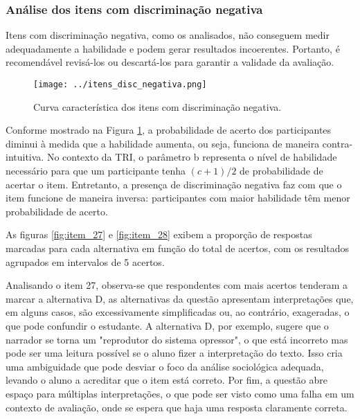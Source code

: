 \subsubsection{Análise dos itens com discriminação negativa}

Itens com discriminação negativa, como os analisados, não conseguem medir adequadamente a habilidade e podem gerar resultados incoerentes. Portanto, é recomendável revisá-los ou descartá-los para garantir a validade da avaliação.


\begin{figure}[!htb]
	\centering
	\caption{Curva característica dos itens com discriminação negativa.}
	\texttt{[image: ../itens\_disc\_negativa.png]}
	\parbox{\textwidth}{
		\centering %
	}
	\label{fig:itens_disc_negativa}
\end{figure}


Conforme mostrado na Figura \ref{fig:itens_disc_negativa}, a probabilidade de acerto dos participantes diminui à medida que a habilidade aumenta, ou seja, funciona de maneira contra-intuitiva. No contexto da TRI, o parâmetro b representa o nível de habilidade necessário para que um participante tenha $(c+1)/2$ de probabilidade de acertar o item. Entretanto, a presença de discriminação negativa faz com que o item funcione de maneira inversa: participantes com maior habilidade têm menor probabilidade de acerto.

As figuras \ref{fig:item_27} e \ref{fig:item_28} exibem a proporção de respostas marcadas para cada alternativa em função do total de acertos, com os resultados agrupados em intervalos de 5 acertos.

Analisando o item 27, observa-se que respondentes com mais acertos tenderam a marcar a alternativa D, as alternativas da questão apresentam interpretações que, em alguns casos, são excessivamente simplificadas ou, ao contrário, exageradas, o que pode confundir o estudante. A alternativa D, por exemplo, sugere que o narrador se torna um "reprodutor do sistema opressor", o que está incorreto mas pode ser uma leitura possível se o aluno fizer a interpretação do texto. Isso cria uma ambiguidade que pode desviar o foco da análise sociológica adequada, levando o aluno a acreditar que o item está correto. Por fim, a questão abre espaço para múltiplas interpretações, o que pode ser visto como uma falha em um contexto de avaliação, onde se espera que haja uma resposta claramente correta.
	
